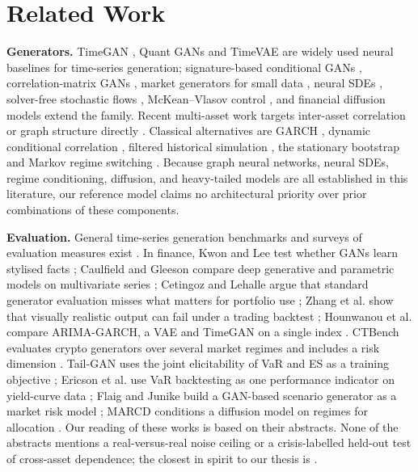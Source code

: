 \documentclass[journal]{IEEEtran}
\begin{document}
\section{Related Work}
\textbf{Generators.} TimeGAN \cite{yoon2019timegan}, Quant GANs \cite{wiese2020quantgans} and TimeVAE
\cite{desai2021timevae} are widely used neural baselines for time-series generation; signature-based
conditional GANs \cite{liao2024sigcwgan}, correlation-matrix GANs \cite{marti2020corrgan}, market generators
for small data \cite{buehler2020market}, neural SDEs \cite{li2020scalable,kidger2021neuralsde,xu2025hgansde,ozai2026nansde},
solver-free stochastic flows \cite{kiyohara2025nsf}, McKean--Vlasov control \cite{boustany2026deepmkv}, and
financial diffusion models \cite{song2021score,tanaka2025cofindiff,choi2026lftd} extend the family. Recent
multi-asset work targets inter-asset correlation or graph structure directly
\cite{masi2023correlated,masi2026gandiffusion,huh2026marketgans,gregnanin2026siggraph,uslu2026graphdiff}.
Classical alternatives are GARCH \cite{bollerslev1986garch}, dynamic conditional correlation \cite{engle2002dcc},
filtered historical simulation \cite{baroneadesi1999fhs}, the stationary bootstrap \cite{politis1994stationary}
and Markov regime switching \cite{hamilton1989regime}. Because graph neural networks, neural SDEs, regime
conditioning, diffusion, and heavy-tailed models are all established in this literature, our reference model
claims no architectural priority over prior combinations of these components.

\textbf{Evaluation.} General time-series generation benchmarks and surveys of evaluation measures exist
\cite{ang2023tsgbench,stenger2024evaluation}. In finance, Kwon and Lee test whether GANs learn stylised facts
\cite{kwon2024stylized}; Caulfield and Gleeson compare deep generative and parametric models on multivariate
series \cite{caulfield2024systematic}; Cetingoz and Lehalle argue that standard generator evaluation misses
what matters for portfolio use \cite{cetingoz2025synthetic}; Zhang et al. show that visually realistic output
can fail under a trading backtest \cite{zhang2026sfag}; Hounwanou et al. compare ARIMA-GARCH, a VAE and TimeGAN
on a single index \cite{hounwanou2025synthetic}. CTBench evaluates crypto generators over several market
regimes and includes a risk dimension \cite{ang2025ctbench}. Tail-GAN uses the joint elicitability of VaR and ES
as a training objective \cite{cont2022tailgan}; Ericson et al. use VaR backtesting as one performance indicator
on yield-curve data \cite{ericson2024var}; Flaig and Junike build a GAN-based scenario generator as a market
risk model \cite{flaig2022scenario}; MARCD conditions a diffusion model on regimes for allocation
\cite{alzahrani2025marcd}. Our reading of these works is based on their abstracts. None of the abstracts
mentions a real-versus-real noise ceiling or a crisis-labelled held-out test of cross-asset dependence; the
closest in spirit to our thesis is \cite{cetingoz2025synthetic}.
\end{document}
